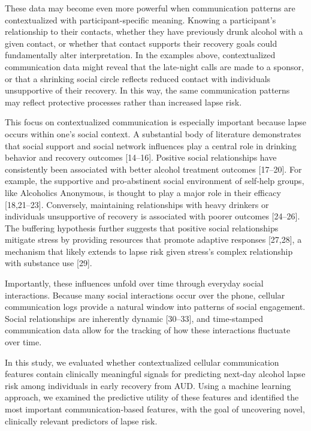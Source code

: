 \documentclass[
  letterpaper,
  DIV=11,
  numbers=noendperiod]{scrartcl}
\begin{document}
These data may become even more powerful when communication patterns are
contextualized with participant-specific meaning. Knowing a
participant's relationship to their contacts, whether they have
previously drunk alcohol with a given contact, or whether that contact
supports their recovery goals could fundamentally alter interpretation.
In the examples above, contextualized communication data might reveal
that the late-night calls are made to a sponsor, or that a shrinking
social circle reflects reduced contact with individuals unsupportive of
their recovery. In this way, the same communication patterns may reflect
protective processes rather than increased lapse risk.

This focus on contextualized communication is especially important
because lapse occurs within one's social context. A substantial body of
literature demonstrates that social support and social network
influences play a central role in drinking behavior and recovery
outcomes {[}14--16{]}. Positive social relationships have consistently
been associated with better alcohol treatment outcomes {[}17--20{]}. For
example, the supportive and pro‑abstinent social environment of
self‑help groups, like Alcoholics Anonymous, is thought to play a major
role in their efficacy {[}18,21--23{]}. Conversely, maintaining
relationships with heavy drinkers or individuals unsupportive of
recovery is associated with poorer outcomes {[}24--26{]}. The buffering
hypothesis further suggests that positive social relationships mitigate
stress by providing resources that promote adaptive responses
{[}27,28{]}, a mechanism that likely extends to lapse risk given
stress's complex relationship with substance use {[}29{]}.

Importantly, these influences unfold over time through everyday social
interactions. Because many social interactions occur over the phone,
cellular communication logs provide a natural window into patterns of
social engagement. Social relationships are inherently dynamic
{[}30--33{]}, and time-stamped communication data allow for the tracking
of how these interactions fluctuate over time.

In this study, we evaluated whether contextualized cellular
communication features contain clinically meaningful signals for
predicting next-day alcohol lapse risk among individuals in early
recovery from AUD. Using a machine learning approach, we examined the
predictive utility of these features and identified the most important
communication-based features, with the goal of uncovering novel,
clinically relevant predictors of lapse risk.
\end{document}
